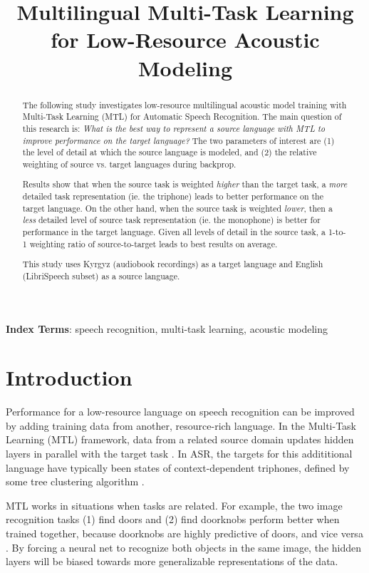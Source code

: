 \documentclass[a4paper]{article}
\title{Multilingual Multi-Task Learning for Low-Resource Acoustic Modeling}
\begin{document}
\maketitle
% 
\begin{abstract}

  The following study investigates low-resource multilingual acoustic model training with Multi-Task Learning (MTL) for Automatic Speech Recognition. The main question of this research is: \textit{What is the best way to represent a source language with MTL to improve performance on the target language?} The two parameters of interest are (1) the level of detail at which the source language is modeled, and (2) the relative weighting of source vs. target languages during backprop.

Results show that when the source task is weighted \textit{higher} than the target task, a \textit{more} detailed task representation (ie. the triphone) leads to better performance on the target language. On the other hand, when the source task is weighted \textit{lower}, then a \textit{less} detailed level of source task representation (ie. the monophone) is better for performance in the target language. Given all levels of detail in the source task, a 1-to-1 weighting ratio of source-to-target leads to best results on average.

This study uses Kyrgyz (audiobook recordings) as a target language and English (LibriSpeech subset) as a source language.
\end{abstract}

\noindent\textbf{Index Terms}: speech recognition, multi-task learning, acoustic modeling





\section{Introduction}

Performance for a low-resource language on speech recognition can be improved by adding training data from another, resource-rich language. In the Multi-Task Learning (MTL) framework, data from a related source domain updates hidden layers in parallel with the target task \cite{caruana1997}. In ASR, the targets for this addititional language have typically been states of context-dependent triphones, defined by some tree clustering algorithm \cite{huang2013,heigold2013,grezl2016}.

MTL works in situations when tasks are related. For example, the two image recognition tasks (1) find doors and (2) find doorknobs perform better when trained together, because doorknobs are highly predictive of doors, and vice versa \cite{caruana1997}. By forcing a neural net to recognize both objects in the same image, the hidden layers will be biased towards more generalizable representations of the data.
\end{document}

